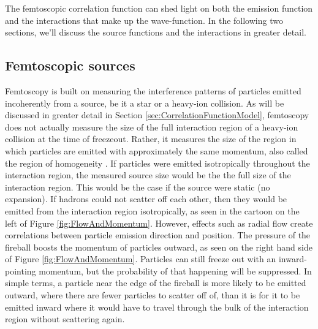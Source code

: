 The femtoscopic correlation function can shed light on both the emission function and the interactions that make up the wave-function.
In the following two sections, we'll discuss the source functions and the interactions in greater detail.

\subsection{Femtoscopic sources} %
\label{sec:FemtoSources}

Femtoscopy is built on measuring the interference patterns of particles emitted incoherently from a source, be it a star or a heavy-ion collision.
As will be discussed in greater detail in Section \ref{sec:CorrelationFunctionModel}, femtoscopy does not actually measure the size of the full interaction region of a heavy-ion collision at the time of freezeout.
Rather, it measures the size of the region in which particles are emitted with approximately the same momentum, also called the region of homogeneity \cite{Akkelin:1995gh}.
If particles were emitted isotropically throughout the interaction region, the measured source size would be the the full size of the interaction region.
This would be the case if the source were static (no expansion).
If hadrons could not scatter off each other, then they would be emitted from the interaction region isotropically, as seen in the cartoon on the left of Figure \ref{fig:FlowAndMomentum}.
However, effects such as radial flow create correlations between particle emission direction and position. 
The pressure of the fireball boosts the momentum of particles outward, as seen on the right hand side of Figure \ref{fig:FlowAndMomentum}.
Particles can still freeze out with an inward-pointing momentum, but the probability of that happening will be suppressed.
In simple terms, a particle near the edge of the fireball is more likely to be emitted outward, where there are fewer particles to scatter off of, than it is for it to be emitted inward where it would have to travel through the bulk of the interaction region without scattering again. 

